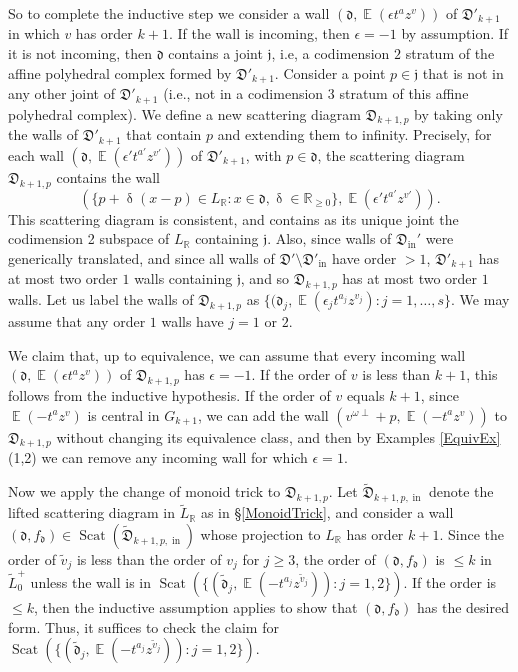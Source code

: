 \documentclass{amsart}
\DeclareMathOperator{\In}{in}
\DeclareMathOperator{\EE}{\mathbb{E}}
\DeclareMathOperator{\scat}{Scat}
\let\bb=\mathbb
\let\f=\mathfrak
\let\wt=\widetilde
\renewcommand{\delta}{\updelta}
\theoremstyle{plain}%
\theoremstyle{definition}
\theoremstyle{remark}
\begin{document}
So to complete the inductive step we consider a wall
$(\f{d},\EE(\epsilon t^{a}z^{v}))$
of $\f{D}'_{k+1}$ in which $v$ has order $k+1$.   If the wall is incoming, then $\epsilon=-1$ by assumption.  If it is not incoming, then $\f{d}$ contains a joint $\f{j}$, i.e, a codimension $2$ stratum of the affine polyhedral complex formed by $\f{D}'_{k+1}$.  Consider a point $p\in \f{j}$ that is not in any other joint of $\f{D}'_{k+1}$ (i.e., not in a codimension $3$ stratum of this affine polyhedral complex).  We define a new scattering diagram $\f{D}_{k+1,p}$ by taking only the walls of $\f{D}'_{k+1}$ that contain $p$ and extending them to infinity.  Precisely, for each wall $(\f{d},\EE(\epsilon' t^{a'}z^{v'}))$ of $\f{D}'_{k+1}$, with $p\in\f{d}$, the scattering diagram $\f{D}_{k+1,p}$ contains the wall 
\[
\left(\{p+\delta(x-p)\in L_{\bb{R}}\colon x\in \f{d},\delta\in \bb{R}_{\geq 0}\},\EE(\epsilon' t^{a'}z^{v'})\right).
\]
This scattering diagram is consistent, and contains as its unique joint the codimension 2 subspace of $L_{\bb{R}}$ containing $\f{j}$.  Also, since walls of $\f{D}_{\In}'$ were generically translated, and since all walls of $\f{D}'\setminus \f{D}'_{\In}$ have order $>1$, $\f{D}'_{k+1}$ has at most two order $1$ walls containing $\f{j}$, and so $\f{D}_{k+1,p}$ has at most two order $1$ walls.  Let us label the walls of $\f{D}_{k+1,p}$ as $\{(\f{d}_j,\EE(\epsilon_jt^{a_j}z^{v_j})\colon j=1,\ldots,s\}$.  We may assume that any order $1$ walls have $j=1$ or $2$.


We claim that, up to equivalence, we can assume that every incoming wall $\left(\f{d},\EE(\epsilon t^{a}z^{v})\right)$ of $\f{D}_{k+1,p}$ has $\epsilon=-1$.  If the order of $v$ is less than $k+1$, this follows from the inductive hypothesis.  If the order of $v$ equals $k+1$, since $\EE(-t^{a}z^{v})$ is central in $G_{k+1}$, we can add the wall $(v^{\omega\perp}+p,\EE(-t^{a}z^{v}))$ to $\f{D}_{k+1,p}$ without changing its equivalence class, and then by Examples \ref{EquivEx}(1,2) we can remove any incoming wall for which $\epsilon=1$.

Now we apply the change of monoid trick to $\f{D}_{k+1,p}$.  Let $\wt{\f{D}}_{k+1,p,\In}$ denote the lifted  scattering diagram in $\wt{L}_{\bb{R}}$ as in \S \ref{MonoidTrick}, and consider a wall  $(\f{d},f_{\f{d}})\in \scat(\wt{\f{D}}_{k+1,p,\In})$ whose projection to $L_{\bb{R}}$ has order $k+1$.    Since the order of $\wt{v}_j$ is less than the order of $v_j$ for $j\geq 3$, the order of $(\f{d},f_{\f{d}})$ is $\leq k$ in $\wt{L}_0^+$ unless the wall is in $\scat(\{(\wt{\f{d}}_j,\EE(-t^{a_j}z^{\wt{v}_j}))\colon j=1,2\})$.  If the order is $\leq k$, then the inductive assumption applies to show that $(\f{d},f_{\f{d}})$ has the desired form.  Thus, it suffices to check the claim for $\scat(\{(\wt{\f{d}}_j,\EE(-t^{a_j}z^{\wt{v}_j}))\colon j=1,2\})$.
\end{document}
